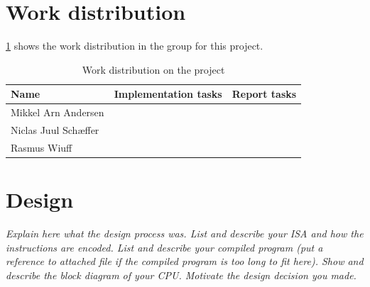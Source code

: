 \documentclass[a4paper, english]{article}
\numberwithin{equation}{section}
\begin{document}
\section{Work distribution}
\cref{tbl:ansvar} shows the work distribution in the group for this project.
\begin{table}[H]
    \centering
    \caption{Work distribution on the project}\label{tbl:ansvar}
    \begin{tabular}{lll}
        \toprule
        Name                 & Implementation tasks & Report tasks \\
        \midrule
        Mikkel Arn Andersen  &                      &              \\
        Niclas Juul Schæffer &                      &              \\
        Rasmus Wiuff         &                      &              \\
        \bottomrule
    \end{tabular}
\end{table}
\section{Design}
\emph{Explain here what the design process was. List and describe your ISA and how the instructions are encoded. List and describe your compiled program (put a reference to attached file if the compiled program is too long to fit here). Show and describe the block diagram of your CPU. Motivate the design decision you made.}
\end{document}
